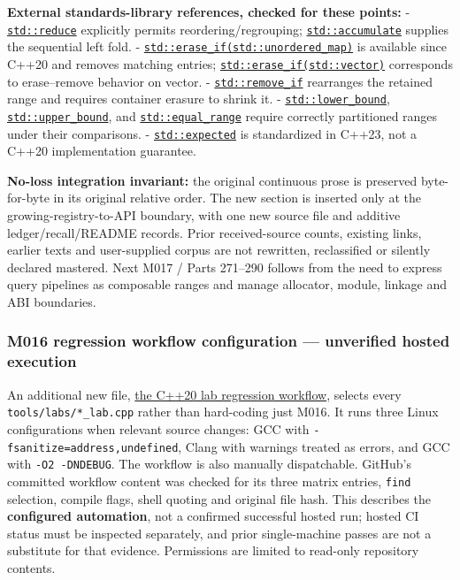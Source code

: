 \textbf{External standards-library references, checked for these points:} - \href{https://en.cppreference.com/cpp/algorithm/reduce}{\texttt{std::reduce}} explicitly permits reordering/regrouping; \href{https://en.cppreference.com/w/cpp/algorithm/accumulate}{\texttt{std::accumulate}} supplies the sequential left fold. - \href{https://en.cppreference.com/cpp/container/unordered_map/erase_if}{\texttt{std::erase\_if(std::unordered\_map)}} is available since C++20 and removes matching entries; \href{https://en.cppreference.com/cpp/container/vector/erase2}{\texttt{std::erase\_if(std::vector)}} corresponds to erase--remove behavior on vector. - \href{https://en.cppreference.com/w/cpp/algorithm/remove}{\texttt{std::remove\_if}} rearranges the retained range and requires container erasure to shrink it. - \href{https://en.cppreference.com/w/cpp/algorithm/lower_bound}{\texttt{std::lower\_bound}}, \href{https://en.cppreference.com/w/cpp/algorithm/upper_bound}{\texttt{std::upper\_bound}}, and \href{https://en.cppreference.com/w/cpp/algorithm/equal_range}{\texttt{std::equal\_range}} require correctly partitioned ranges under their comparisons. - \href{https://en.cppreference.com/w/cpp/utility/expected}{\texttt{std::expected}} is standardized in C++23, not a C++20 implementation guarantee.

\textbf{No-loss integration invariant:} the original continuous prose is preserved byte-for-byte in its original relative order. The new section is inserted only at the growing-registry-to-API boundary, with one new source file and additive ledger/recall/README records. Prior received-source counts, existing links, earlier texts and user-supplied corpus are not rewritten, reclassified or silently declared mastered. Next M017 / Parts 271--290 follows from the need to express query pipelines as composable ranges and manage allocator, module, linkage and ABI boundaries.

\subsubsection{M016 regression workflow configuration --- unverified hosted execution}\label{appendix-a103e7846d21-m016-regression-workflow-configuration-unverified-hosted-execution}

An additional new file, \hyperref[source-file-3b1d957d4b185d11d5c207e1]{the C++20 lab regression workflow}, selects every \texttt{tools/labs/*\_lab.cpp} rather than hard-coding just M016. It runs three Linux configurations when relevant source changes: GCC with \texttt{-fsanitize=address,undefined}, Clang with warnings treated as errors, and GCC with \texttt{-O2\ -DNDEBUG}. The workflow is also manually dispatchable. GitHub's committed workflow content was checked for its three matrix entries, \texttt{find} selection, compile flags, shell quoting and original file hash. This describes the \textbf{configured automation}, not a confirmed successful hosted run; hosted CI status must be inspected separately, and prior single-machine passes are not a substitute for that evidence. Permissions are limited to read-only repository contents.

